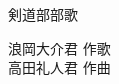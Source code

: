 \documentclass[10pt,b5j]{tarticle} %
\begin{document}
\begin{minipage}[c]{0.7\hsize} %
    \begin{center}
        {\LARGE
            剣道部部歌 %
        }
        {\small 
        }
    \end{center}
\end{minipage}
\begin{minipage}[c]{0.3\hsize} %
    \begin{flushright} %
        浪岡大介君 作歌\\高田礼人君 作曲 %
    \end{flushright}
\end{minipage}
\end{document}
